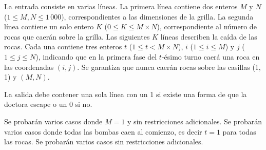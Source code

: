 \documentclass{oci}
\begin{document}
\begin{inputDescription}
  La entrada consiste en varias líneas.
  La primera línea contiene dos enteros $M$ y $N$ ($1 \le M, N \le 1\,000$), correspondientes a las
  dimensiones de la grilla.
  La segunda línea contiene un solo entero $K$ ($0 \le K \le M\times N$), correspondiente al número de
  rocas que caerán sobre la grilla.
  Las siguientes $K$ líneas describen la caída de las rocas.
  Cada una contiene tres enteros $t$ ($1 \le t < M\times N$), $i$ ($1 \le i \le M$) y $j$ ($1 \le
  j \le N$), indicando que en la primera fase del $t$-ésimo turno caerá una roca en las coordenadas $(i,
  j)$.
  Se garantiza que nunca caerán rocas sobre las casillas (1, 1) y $(M, N)$.
\end{inputDescription}

\begin{outputDescription}
  La salida debe contener una sola línea con un 1 si existe una forma de que la doctora escape o un 0
  si no.
\end{outputDescription}

\begin{scoreDescription}
  Se probarán varios casos donde $M = 1$ y sin restricciones adicionales.
  Se probarán varios casos donde todas las bombas caen al comienzo, es decir $t = 1$ para todas las rocas.
  Se probarán varios casos sin restricciones adicionales.
\end{scoreDescription}

\begin{sampleDescription}
\end{sampleDescription}
\end{document}
